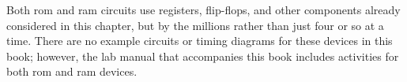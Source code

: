 Both \gls{rom} and \gls{ram} circuits use registers, flip-flops, and other components already considered in this chapter, but by the millions rather than just four or so at a time. There are no example circuits or timing diagrams for these devices in this book; however, the lab manual that accompanies this book includes activities for both \gls{rom} and \gls{ram} devices.

















